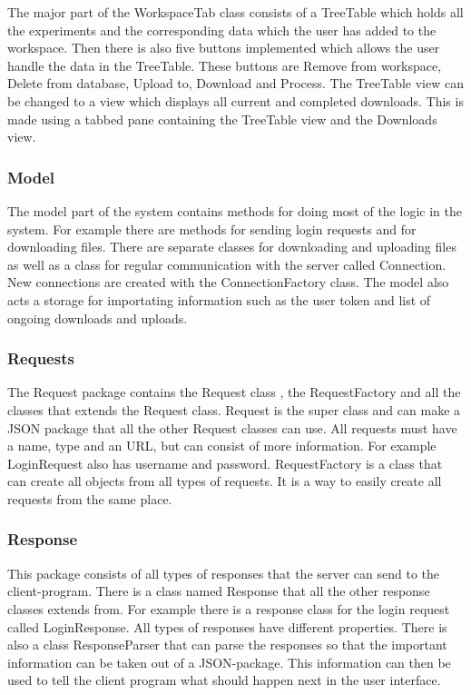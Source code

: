 The major part of the WorkspaceTab class consists of a TreeTable which holds all the experiments and the corresponding data which the user has added to the workspace. Then there is also five buttons implemented which allows the user handle the data in the TreeTable. These buttons are Remove from workspace, Delete from database, Upload to, Download and Process. The TreeTable view can be changed to a view which displays all current and completed downloads. This is made using a tabbed pane containing the TreeTable view and the Downloads view.

\subsubsection{Model}
The model part of the system contains methods for doing most of the logic in the system. For example there are methods for sending login requests and for downloading files. There are separate classes for downloading and uploading files as well as a class for regular communication with the server called Connection. New connections are created with the ConnectionFactory class. The model also acts a storage for importating information such as the user token and list of ongoing downloads and uploads.

\subsubsection{Requests}
The Request package contains the Request class , the RequestFactory and all the classes that extends the Request class. Request is the super class and can make a JSON package that all the other Request classes can use. All requests must have a name, type and an URL, but can consist of more information. For example LoginRequest also has username and password. RequestFactory is a class that can create all objects from all types of requests. It is a way to easily create all requests from the same place.


\subsubsection{Response}
This package consists of all types of responses that the server can send to the client-program. There is a class named Response that all the other response classes extends from. For example there is a response class for the login request called LoginResponse. All types of responses have different properties. There is also a class ResponseParser that can parse the responses so that the important information can be taken out of a JSON-package. This information can then be used to tell the client program what should happen next in the user interface.


